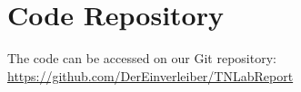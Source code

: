 \appendix
\section{Code Repository}
The code can be accessed on our Git repository: \href{https://github.com/DerEinverleiber/TNLabReport}{https://github.com/DerEinverleiber/TNLabReport}


